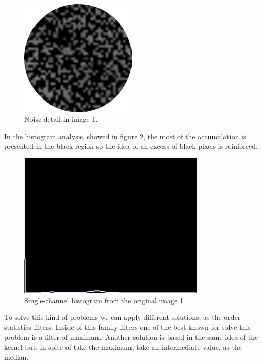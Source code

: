 \begin{figure}[!ht]
	\centering
	\includegraphics[width=0.5\textwidth]{figures/1-noiseDetail}
	\caption{Noise detail in image 1.}
	\label{fig:1-noiseDetail}
\end{figure}

In the histogram analysis, showed in figure \ref{fig:1-histogramOriginal}, the most of the accumulation is presented in the black region so the idea of an excess of black pixels is reinforced.

\begin{figure}[!ht]
	\centering
	\includegraphics[width=0.8\textwidth]{figures/1-histogramOriginal}
	\caption{Single-channel histogram from the original image 1.}
	\label{fig:1-histogramOriginal}
\end{figure}

To solve this kind of problems we can apply different solutions, as the order-statistics filters. Inside of this family filters one of the best known for solve this problem is a filter of maximum. Another solution is based in the same idea of the kernel but, in spite of take the maximum, take an intermediate value, as the median. 

